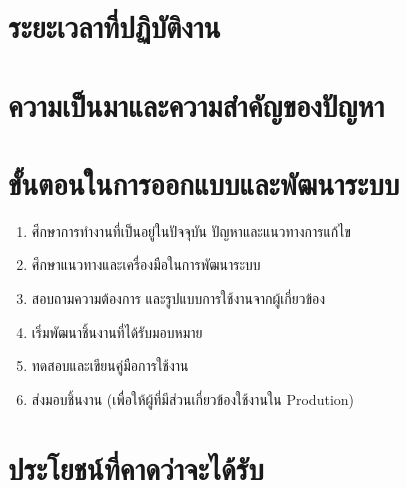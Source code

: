 \section{ระยะเวลาที่ปฏิบัติงาน}

\section{ความเป็นมาและความสำคัญของปัญหา}

\section{ขั้นตอนในการออกแบบและพัฒนาระบบ}
\begin{enumerate}
    \item ศีกษาการทำงานที่เป็นอยู่ในปัจจุบัน ปัญหาและแนวทางการแก้ไข
    \item ศึกษาแนวทางและเครื่องมือในการพัฒนาระบบ
    \item สอบถามความต้องการ และรูปแบบการใช้งานจากผู้เกี่ยวข้อง
    \item เริ่มพัฒนาชิ้นงานที่ได้รับมอบหมาย
    \item ทดสอบและเขียนคู่มือการใช้งาน
    \item ส่งมอบชิ้นงาน (เพื่อให้ผู้ที่มีส่วนเกี่ยวข้องใช้งานใน Prodution)
\end{enumerate}

\section{ประโยชน์ที่คาดว่าจะได้รับ}









